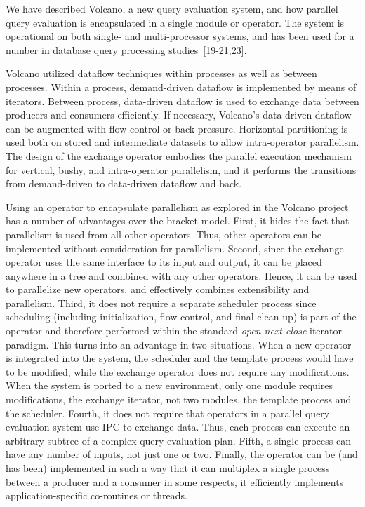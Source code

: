 \documentclass[a4paper,12pt,notitlepage,twoside,openright]{article}
\begin{document}
We have described Volcano, a new query evaluation
system, and how parallel query evaluation is encapsulated in
a single module or operator. The system is operational on
both single- and multi-processor systems, and has been used
for a number in database query processing studies~{[19-21,23]}.

Volcano utilized dataflow techniques within processes
as well as between processes. Within a process, demand-driven
dataflow is implemented by means of iterators.
Between process, data-driven dataflow is used to exchange
data between producers and consumers efficiently. If necessary,
Volcano's data-driven dataflow can be augmented with
flow control or back pressure. Horizontal partitioning is
used both on stored and intermediate datasets to allow
intra-operator parallelism. The design of the exchange
operator embodies the parallel execution mechanism for
vertical, bushy, and intra-operator parallelism, and it performs
the transitions from demand-driven to data-driven
dataflow and back.

Using an operator to encapsulate parallelism as
explored in the Volcano project has a number of advantages
over the bracket model. First, it hides the fact that parallelism
is used from all other operators. Thus, other operators
can be implemented without consideration for parallelism.
Second, since the exchange operator uses the same
interface to its input and output, it can be placed anywhere
in a tree and combined with any other operators. Hence, it
can be used to parallelize new operators, and effectively
combines extensibility and parallelism. Third, it does not
require a separate scheduler process since scheduling
(including initialization, flow control, and final clean-up) is
part of the operator and therefore performed within the standard
\emph{open-next-close} iterator paradigm. This turns into an
advantage in two situations. When a new operator is
integrated into the system, the scheduler and the template
process would have to be modified, while the exchange
operator does not require any modifications. When the system
is ported to a new environment, only one module
requires modifications, the exchange iterator, not two
modules, the template process and the scheduler. Fourth, it
does not require that operators in a parallel query evaluation
system use IPC to exchange data. Thus, each process can
execute an arbitrary subtree of a complex query evaluation
plan. Fifth, a single process can have any number of
inputs, not just one or two. Finally, the operator can be
(and has been) implemented in such a way that it can multiplex
a single process between a producer and a consumer
in some respects, it efficiently implements application-specific
co-routines or threads.
\end{document}
